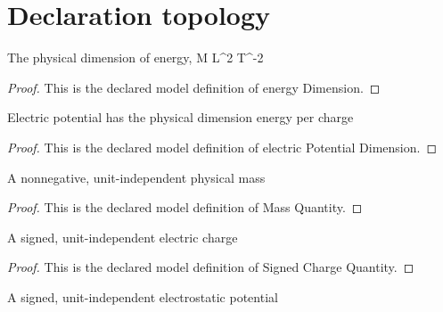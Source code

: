 \section{Declaration topology}
\begin{definition}
  \label{def:physics:phyx-mini-0865:phyxminiproblems-problemphyxmini0865-energydimension}
  The physical dimension of energy, M L\textasciicircum{}2 T\textasciicircum{}-2
\end{definition}
\begin{proof}
  This is the declared model definition of energy Dimension.
\end{proof}
\begin{definition}
  \label{def:physics:phyx-mini-0865:phyxminiproblems-problemphyxmini0865-electricpotentialdimension}
  Electric potential has the physical dimension energy per charge
\end{definition}
\begin{proof}
  This is the declared model definition of electric Potential Dimension.
\end{proof}
\begin{definition}
  \label{def:physics:phyx-mini-0865:phyxminiproblems-problemphyxmini0865-massquantity}
  A nonnegative, unit-independent physical mass
\end{definition}
\begin{proof}
  This is the declared model definition of Mass Quantity.
\end{proof}
\begin{definition}
  \label{def:physics:phyx-mini-0865:phyxminiproblems-problemphyxmini0865-signedchargequantity}
  A signed, unit-independent electric charge
\end{definition}
\begin{proof}
  This is the declared model definition of Signed Charge Quantity.
\end{proof}
\begin{definition}
  \label{def:physics:phyx-mini-0865:phyxminiproblems-problemphyxmini0865-electricpotentialquantity}
  A signed, unit-independent electrostatic potential
\end{definition}
